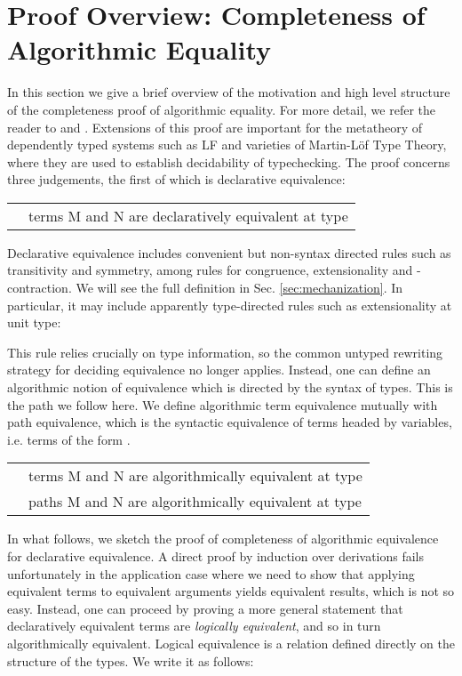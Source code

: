 \documentclass[copyright,creativecommons]{eptcs}
\begin{document}
\section{Proof Overview: Completeness of Algorithmic Equality}\label{sec:proofoverview}
In this
section we give a brief overview of the motivation and high level structure of
the completeness proof of algorithmic equality. For more detail, we refer the
reader to \cite{Crary:ATAPL} and \cite{Harper03tocl}. Extensions of 
this proof are important for the metatheory of dependently typed systems such as
LF and varieties of Martin-L\"of 
Type Theory, where they are used to establish decidability of typechecking. The proof concerns
three judgements, the first of which is declarative equivalence:

\begin{center}
  \begin{tabular}{@{}l@{~~~}l@{}}
 & terms M and N are declaratively equivalent at
type 
  \end{tabular}
\end{center}

Declarative equivalence includes convenient but non-syntax directed rules
such as transitivity and symmetry, among rules for congruence,
extensionality and -contraction. We will see the full definition
in Sec. \ref{sec:mechanization}. In particular, it may include
apparently type-directed rules such as extensionality at unit type:



This rule relies crucially on type information, so the common
untyped rewriting strategy for deciding equivalence no longer
applies. Instead, one can define an algorithmic notion of equivalence
which is directed by the syntax of types. This is the path we follow
here. We define algorithmic term equivalence 
mutually with path equivalence, which is the syntactic equivalence of terms headed by
variables, i.e. terms of the form . 

\begin{center}
  \begin{tabular}{@{}l@{~~~}l@{}}
 & terms M and N are
algorithmically equivalent at type  \\
 & paths M and N are
algorithmically equivalent at type  \\
  \end{tabular}
\end{center}

In what follows, we sketch the proof of completeness of
algorithmic equivalence for declarative 
equivalence. A direct proof by induction over
derivations fails unfortunately in the application case where we need to show that
applying equivalent terms to equivalent arguments yields equivalent
results, which is not so easy. Instead, one can proceed by proving a
more general statement that declaratively equivalent terms are
\emph{logically equivalent}, and so in turn algorithmically
equivalent. Logical equivalence is a relation defined directly on the
structure of the types. We write it as follows:
\end{document}
